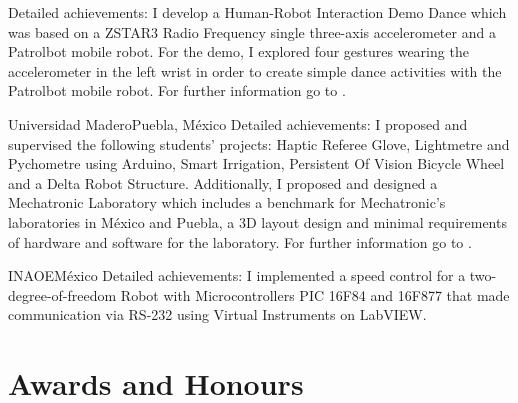 \documentclass[10pt,a4paper,roman]{moderncv}
\begin{document}
{Detailed achievements: I develop a Human-Robot Interaction Demo Dance which  was based on a ZSTAR3 Radio
Frequency single three-axis accelerometer and a Patrolbot mobile robot.
For the demo, I explored four gestures wearing the accelerometer in the left wrist
in order to create simple dance activities with the Patrolbot mobile robot.
For further information go to \href{https://sites.google.com/site/perezxochicale/projects/demodance}{\faExternalLink}.}

{Universidad Madero}{Puebla, M\'exico}{}
{Detailed achievements:
I proposed and supervised the following students' projects: Haptic Referee Glove,
 Lightmetre and Pychometre using Arduino, Smart Irrigation, Persistent Of Vision Bicycle Wheel
 and a Delta Robot Structure.
\href{https://sites.google.com/site/perezxochicaleprojects/studentprojects}{\faExternalLink}
Additionally, I proposed and designed a Mechatronic Laboratory which includes a benchmark for
Mechatronic's laboratories in M\'exico and Puebla, a 3D layout design and minimal
requirements of hardware and software for the laboratory.
For further information go to \href{https://sites.google.com/site/perezxochicaleprojects/mechatronicslaboratorydesign}{\faExternalLink}.
}

{INAOE}{M\'exico}{}
{Detailed achievements:
I implemented a speed control for a two-degree-of-freedom Robot with Microcontrollers
PIC 16F84 and 16F877 that made communication via RS-232 using Virtual Instruments on LabVIEW.}

\section{Awards and Honours}


\end{document}
